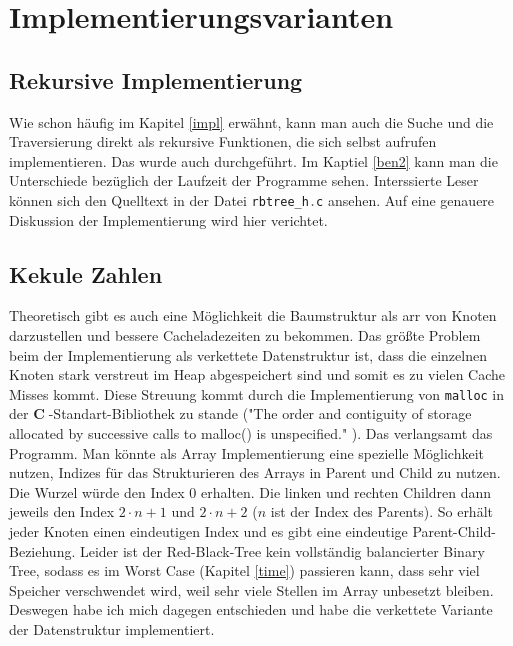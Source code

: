 \documentclass[11pt]{article}
\newcommand{\lstin}[1]{\lstinline[language=C]{#1}}
\newcommand{\cpl}{\textbf{C}$\;$}
\begin{document}
\section{Implementierungsvarianten}

\subsection{Rekursive Implementierung} 
Wie schon häufig im Kapitel \ref{impl} erwähnt, kann man auch die Suche und die Traversierung direkt als rekursive Funktionen, die sich selbst aufrufen implementieren. Das wurde auch durchgeführt. Im Kaptiel \ref{ben2} kann man die Unterschiede bezüglich der Laufzeit der Programme sehen.
Interssierte Leser können sich den Quelltext in der Datei \lstin{rbtree_h.c} ansehen. Auf eine genauere Diskussion der Implementierung wird hier verichtet.

\subsection{Kekule Zahlen}
Theoretisch gibt es auch eine Möglichkeit die Baumstruktur als \gls{arr} von Knoten darzustellen und bessere Cacheladezeiten zu bekommen.
Das größte Problem beim der Implementierung als verkettete Datenstruktur ist, dass die einzelnen Knoten stark verstreut im Heap abgespeichert sind und somit es zu vielen Cache Misses kommt. Diese Streuung kommt durch die Implementierung von \lstin{malloc} in der \cpl-Standart-Bibliothek zu stande ("The order and contiguity of storage allocated by successive calls to malloc() is unspecified." \cite{IEEEmalloc}). Das verlangsamt das Programm.
Man könnte als Array Implementierung eine spezielle Möglichkeit nutzen, Indizes für das Strukturieren des Arrays in Parent und Child zu nutzen.
Die Wurzel würde den Index 0 erhalten. Die linken und rechten Children dann jeweils den Index $2 \cdot n + 1$ und $2 \cdot n + 2$ ($n$ ist der Index des Parents). So erhält jeder Knoten einen eindeutigen Index und es gibt eine eindeutige Parent-Child-Beziehung.
Leider ist der Red-Black-Tree kein vollständig balancierter Binary Tree, sodass es im Worst Case (Kapitel \ref{time}) passieren kann, dass sehr viel Speicher verschwendet wird, weil sehr viele Stellen im Array unbesetzt bleiben. Deswegen habe ich mich dagegen entschieden und habe die verkettete Variante der Datenstruktur implementiert.
\end{document}
